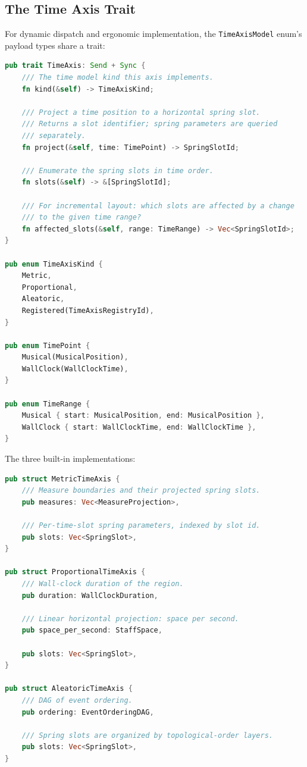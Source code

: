 \documentclass[11pt,letterpaper]{report}
\begin{document}
\subsection{The Time Axis Trait}

For dynamic dispatch and ergonomic implementation, the
\texttt{TimeAxisModel} enum's payload types share a trait:

\begin{lstlisting}[language=Rust]
pub trait TimeAxis: Send + Sync {
    /// The time model kind this axis implements.
    fn kind(&self) -> TimeAxisKind;

    /// Project a time position to a horizontal spring slot.
    /// Returns a slot identifier; spring parameters are queried
    /// separately.
    fn project(&self, time: TimePoint) -> SpringSlotId;

    /// Enumerate the spring slots in time order.
    fn slots(&self) -> &[SpringSlotId];

    /// For incremental layout: which slots are affected by a change
    /// to the given time range?
    fn affected_slots(&self, range: TimeRange) -> Vec<SpringSlotId>;
}

pub enum TimeAxisKind {
    Metric,
    Proportional,
    Aleatoric,
    Registered(TimeAxisRegistryId),
}

pub enum TimePoint {
    Musical(MusicalPosition),
    WallClock(WallClockTime),
}

pub enum TimeRange {
    Musical { start: MusicalPosition, end: MusicalPosition },
    WallClock { start: WallClockTime, end: WallClockTime },
}
\end{lstlisting}

The three built-in implementations:

\begin{lstlisting}[language=Rust]
pub struct MetricTimeAxis {
    /// Measure boundaries and their projected spring slots.
    pub measures: Vec<MeasureProjection>,

    /// Per-time-slot spring parameters, indexed by slot id.
    pub slots: Vec<SpringSlot>,
}

pub struct ProportionalTimeAxis {
    /// Wall-clock duration of the region.
    pub duration: WallClockDuration,

    /// Linear horizontal projection: space per second.
    pub space_per_second: StaffSpace,

    pub slots: Vec<SpringSlot>,
}

pub struct AleatoricTimeAxis {
    /// DAG of event ordering.
    pub ordering: EventOrderingDAG,

    /// Spring slots are organized by topological-order layers.
    pub slots: Vec<SpringSlot>,
}
\end{lstlisting}
\end{document}
